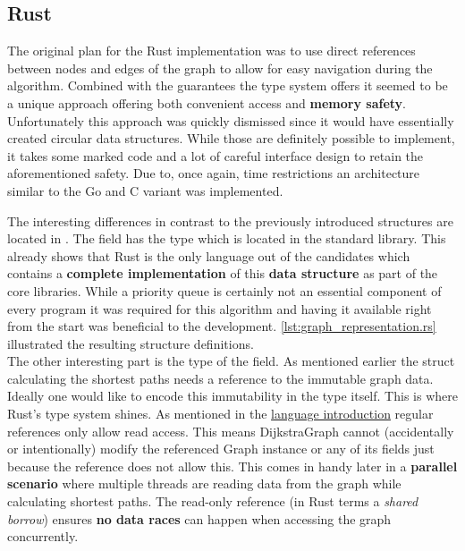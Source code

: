 \subsection{Rust}
\label{subsec:Implementation::Graph_Representation::Rust}

The original plan for the Rust implementation was to use direct references between nodes and edges of the graph to allow for easy navigation during the algorithm. Combined with the guarantees the type system offers it seemed to be a unique approach offering both convenient access and \textbf{memory safety}. Unfortunately this approach was quickly dismissed since it would have essentially created circular data structures. While those are definitely possible to implement, it takes some  marked code and a lot of careful interface design to retain the aforementioned safety. Due to, once again, time restrictions an architecture similar to the Go and C variant was implemented.

The interesting differences in contrast to the previously introduced structures are located in . The  field has the type  which is located in the standard library. This already shows that Rust is the only language out of the candidates which contains a \textbf{complete implementation} of this \textbf{data structure} as part of the core libraries. While a priority queue is certainly not an essential component of every program it was required for this algorithm and having it available right from the start was beneficial to the development. \autoref{lst:graph_representation.rs} illustrated the resulting structure definitions.
\\


The other interesting part is the type of the  field. As mentioned earlier the struct calculating the shortest paths needs a reference to the immutable graph data. Ideally one would like to encode this immutability in the type itself. This is where Rust's type system shines. As mentioned in the \hyperref[subsec:State_of_the_art::Candidates::Rust]{language introduction} regular references only allow read access. This means DijkstraGraph cannot (accidentally or intentionally) modify the referenced Graph instance or any of its fields just because the reference does not allow this. This comes in handy later in a \textbf{parallel scenario} where multiple threads are reading data from the graph while calculating shortest paths. The read-only reference (in Rust terms a \textit{shared borrow}) ensures \textbf{no data races} can happen when accessing the graph concurrently.

